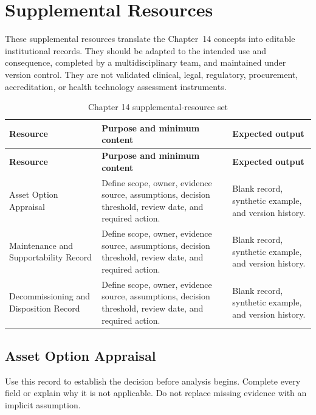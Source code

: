\section{Supplemental Resources}
\label{sec:comp-ch14-supplemental}

These supplemental resources translate the Chapter~14 concepts into editable
institutional records. They should be adapted to the intended use and consequence,
completed by a multidisciplinary team, and maintained under version control. They
are not validated clinical, legal, regulatory, procurement, accreditation, or health
technology assessment instruments.

\begin{longtable}{@{}p{}p{}p{}@{}}
\caption{Chapter 14 supplemental-resource set}
\label{tab:comp-ch14-supplemental-set}\\
\toprule
\textbf{Resource} & \textbf{Purpose and minimum content} & \textbf{Expected output} \\
\midrule
\endfirsthead
\toprule
\textbf{Resource} & \textbf{Purpose and minimum content} & \textbf{Expected output} \\
\midrule
\endhead
\bottomrule
\endlastfoot
Asset Option Appraisal & Define scope, owner, evidence source, assumptions, decision threshold, review date, and required action. & Blank record, synthetic example, and version history. \\
Maintenance and Supportability Record & Define scope, owner, evidence source, assumptions, decision threshold, review date, and required action. & Blank record, synthetic example, and version history. \\
Decommissioning and Disposition Record & Define scope, owner, evidence source, assumptions, decision threshold, review date, and required action. & Blank record, synthetic example, and version history. \\
\end{longtable}

\subsection{Asset Option Appraisal}
\label{sec:comp-ch14-supp-1}
Use this record to establish the decision before analysis begins. Complete every
field or explain why it is not applicable. Do not replace missing evidence with an
implicit assumption.

